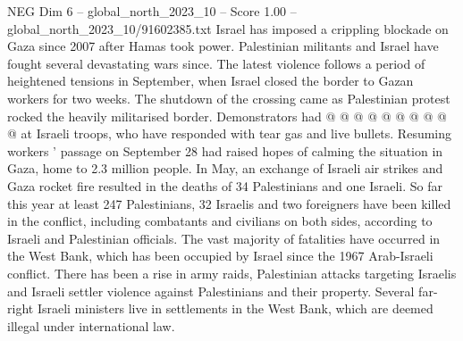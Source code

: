 \begin{textsample}{NEG Dim 6 – global\_north\_2023\_10 – Score 1.00 – global\_north\_2023\_10/91602385.txt}
Israel has imposed a crippling blockade on Gaza since 2007 after Hamas took power.
Palestinian militants and Israel have fought several devastating wars since.
The latest violence follows a period of heightened tensions in September, when Israel closed the border to Gazan workers for two weeks.
The shutdown of the crossing came as Palestinian protest rocked the heavily militarised border.
Demonstrators had @ @ @ @ @ @ @ @ @ @ at Israeli troops, who have responded with tear gas and live bullets.
Resuming workers ' passage on September 28 had raised hopes of calming the situation in Gaza, home to 2.3 million people.
In May, an exchange of Israeli air strikes and Gaza rocket fire resulted in the deaths of 34 Palestinians and one Israeli.
So far this year at least 247 Palestinians, 32 Israelis and two foreigners have been killed in the conflict, including combatants and civilians on both sides, according to Israeli and Palestinian officials.
The vast majority of fatalities have occurred in the West Bank, which has been occupied by Israel since the 1967 Arab-Israeli conflict.
There has been a rise in army raids, Palestinian attacks targeting Israelis and Israeli settler violence against Palestinians and their property.
Several far-right Israeli ministers live in settlements in the West Bank, which are deemed illegal under international law.

\end{textsample}
